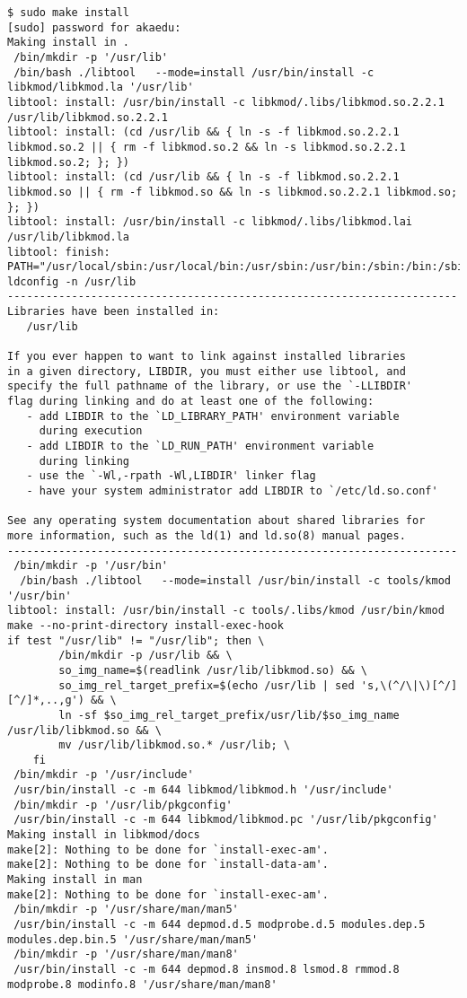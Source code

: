 \documentclass[11pt,a4paper]{article}
\begin{document}
{\begin{shaded}\begin{verbatim}
$ sudo make install
[sudo] password for akaedu: 
Making install in .
 /bin/mkdir -p '/usr/lib'
 /bin/bash ./libtool   --mode=install /usr/bin/install -c   libkmod/libkmod.la '/usr/lib'
libtool: install: /usr/bin/install -c libkmod/.libs/libkmod.so.2.2.1 /usr/lib/libkmod.so.2.2.1
libtool: install: (cd /usr/lib && { ln -s -f libkmod.so.2.2.1 libkmod.so.2 || { rm -f libkmod.so.2 && ln -s libkmod.so.2.2.1 libkmod.so.2; }; })
libtool: install: (cd /usr/lib && { ln -s -f libkmod.so.2.2.1 libkmod.so || { rm -f libkmod.so && ln -s libkmod.so.2.2.1 libkmod.so; }; })
libtool: install: /usr/bin/install -c libkmod/.libs/libkmod.lai /usr/lib/libkmod.la
libtool: finish: PATH="/usr/local/sbin:/usr/local/bin:/usr/sbin:/usr/bin:/sbin:/bin:/sbin" ldconfig -n /usr/lib
----------------------------------------------------------------------
Libraries have been installed in:
   /usr/lib

If you ever happen to want to link against installed libraries
in a given directory, LIBDIR, you must either use libtool, and
specify the full pathname of the library, or use the `-LLIBDIR'
flag during linking and do at least one of the following:
   - add LIBDIR to the `LD_LIBRARY_PATH' environment variable
     during execution
   - add LIBDIR to the `LD_RUN_PATH' environment variable
     during linking
   - use the `-Wl,-rpath -Wl,LIBDIR' linker flag
   - have your system administrator add LIBDIR to `/etc/ld.so.conf'

See any operating system documentation about shared libraries for
more information, such as the ld(1) and ld.so(8) manual pages.
----------------------------------------------------------------------
 /bin/mkdir -p '/usr/bin'
  /bin/bash ./libtool   --mode=install /usr/bin/install -c tools/kmod '/usr/bin'
libtool: install: /usr/bin/install -c tools/.libs/kmod /usr/bin/kmod
make --no-print-directory install-exec-hook
if test "/usr/lib" != "/usr/lib"; then \
        /bin/mkdir -p /usr/lib && \
        so_img_name=$(readlink /usr/lib/libkmod.so) && \
        so_img_rel_target_prefix=$(echo /usr/lib | sed 's,\(^/\|\)[^/][^/]*,..,g') && \
        ln -sf $so_img_rel_target_prefix/usr/lib/$so_img_name /usr/lib/libkmod.so && \
        mv /usr/lib/libkmod.so.* /usr/lib; \
    fi
 /bin/mkdir -p '/usr/include'
 /usr/bin/install -c -m 644 libkmod/libkmod.h '/usr/include'
 /bin/mkdir -p '/usr/lib/pkgconfig'
 /usr/bin/install -c -m 644 libkmod/libkmod.pc '/usr/lib/pkgconfig'
Making install in libkmod/docs
make[2]: Nothing to be done for `install-exec-am'.
make[2]: Nothing to be done for `install-data-am'.
Making install in man
make[2]: Nothing to be done for `install-exec-am'.
 /bin/mkdir -p '/usr/share/man/man5'
 /usr/bin/install -c -m 644 depmod.d.5 modprobe.d.5 modules.dep.5 modules.dep.bin.5 '/usr/share/man/man5'
 /bin/mkdir -p '/usr/share/man/man8'
 /usr/bin/install -c -m 644 depmod.8 insmod.8 lsmod.8 rmmod.8 modprobe.8 modinfo.8 '/usr/share/man/man8'
\end{verbatim}\end{shaded}}
\end{document}
